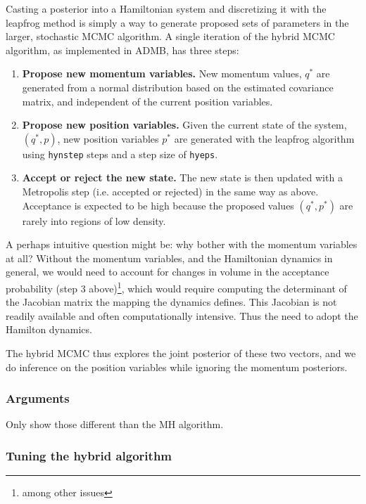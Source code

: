 \documentclass{article}\usepackage[]{graphicx}\usepackage[]{color}
\begin{document}
Casting a posterior into a Hamiltonian system and discretizing it with the
leapfrog method is simply a way to generate proposed sets of parameters in
the larger, stochastic MCMC algorithm. A single iteration of the hybrid
MCMC algorithm, as implemented in ADMB, has three steps:
\begin{enumerate}
\item \textbf{Propose new momentum variables.} New momentum values, $q^*$
  are generated from a normal distribution based on the estimated
  covariance matrix, and independent of the current position variables.
\item \textbf{Propose new position variables.} Given the current state of
  the system, $(q^*,p)$, new position variables $p^*$ are generated with
  the leapfrog algorithm using \texttt{hynstep} steps and a step size of
  \texttt{hyeps}.
\item \textbf{Accept or reject the new state.} The new state is then
  updated with a Metropolis step (i.e. accepted or rejected) in the same
  way as above. Acceptance is expected to be high because the proposed
  values $(q^*, p^*)$ are rarely into regions of low density.
\end{enumerate}

A perhaps intuitive question might be: why bother with the momentum
variables at all? Without the momentum variables, and the Hamiltonian
dynamics in general, we would need to account for changes in volume in the
acceptance probability (step 3 above)\cite{brooks2011}\footnote{among other
  issues}, which would require computing the determinant of the Jacobian
matrix the mapping the dynamics defines. This Jacobian is not readily
available and often computationally intensive. Thus the need to adopt the
Hamilton dynamics.

The hybrid MCMC thus explores the joint posterior of these two vectors, and
we do inference on the position variables while ignoring the momentum
posteriors.

\subsubsection{Arguments}
Only show those different than the MH algorithm.

\subsubsection{Tuning the hybrid algorithm}




\end{document}
